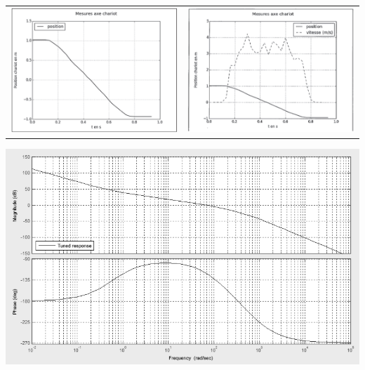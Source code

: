 \documentclass[10pt,fleqn]{article} %
\begin{document}
\begin{center}
\begin{tabular}{cc}
\includegraphics[width=7cm]{images/image13} &
\includegraphics[width=7cm]{images/image14}

\end{tabular}
\end{center}

 \begin{center}
\includegraphics[width=\textwidth]{images/image12}
\end{center} 
\end{document}
